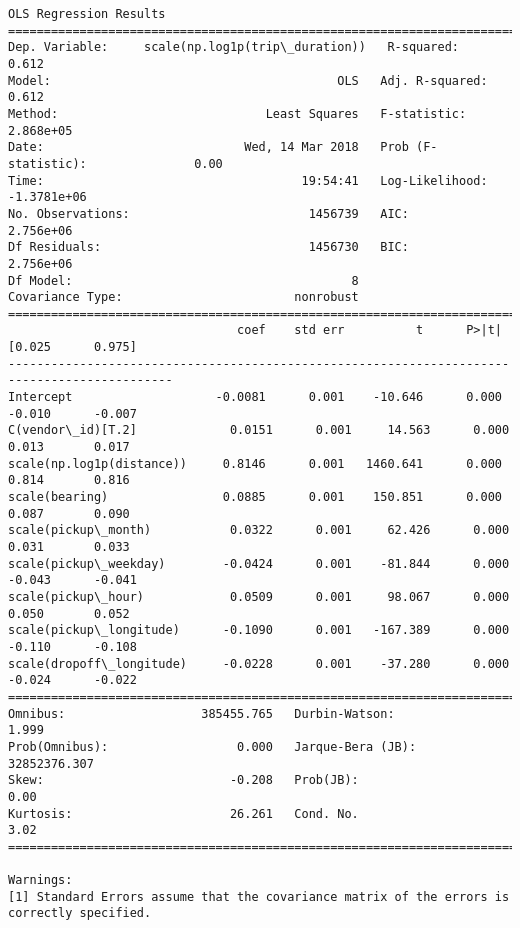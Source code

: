 \documentclass[11pt]{article}
\begin{document}
    \begin{Verbatim}[commandchars=\\\{\}]
                                  OLS Regression Results                                  
==========================================================================================
Dep. Variable:     scale(np.log1p(trip\_duration))   R-squared:                       0.612
Model:                                        OLS   Adj. R-squared:                  0.612
Method:                             Least Squares   F-statistic:                 2.868e+05
Date:                            Wed, 14 Mar 2018   Prob (F-statistic):               0.00
Time:                                    19:54:41   Log-Likelihood:            -1.3781e+06
No. Observations:                         1456739   AIC:                         2.756e+06
Df Residuals:                             1456730   BIC:                         2.756e+06
Df Model:                                       8                                         
Covariance Type:                        nonrobust                                         
=============================================================================================
                                coef    std err          t      P>|t|      [0.025      0.975]
---------------------------------------------------------------------------------------------
Intercept                    -0.0081      0.001    -10.646      0.000      -0.010      -0.007
C(vendor\_id)[T.2]             0.0151      0.001     14.563      0.000       0.013       0.017
scale(np.log1p(distance))     0.8146      0.001   1460.641      0.000       0.814       0.816
scale(bearing)                0.0885      0.001    150.851      0.000       0.087       0.090
scale(pickup\_month)           0.0322      0.001     62.426      0.000       0.031       0.033
scale(pickup\_weekday)        -0.0424      0.001    -81.844      0.000      -0.043      -0.041
scale(pickup\_hour)            0.0509      0.001     98.067      0.000       0.050       0.052
scale(pickup\_longitude)      -0.1090      0.001   -167.389      0.000      -0.110      -0.108
scale(dropoff\_longitude)     -0.0228      0.001    -37.280      0.000      -0.024      -0.022
==============================================================================
Omnibus:                   385455.765   Durbin-Watson:                   1.999
Prob(Omnibus):                  0.000   Jarque-Bera (JB):         32852376.307
Skew:                          -0.208   Prob(JB):                         0.00
Kurtosis:                      26.261   Cond. No.                         3.02
==============================================================================

Warnings:
[1] Standard Errors assume that the covariance matrix of the errors is correctly specified.

    \end{Verbatim}
\end{document}
